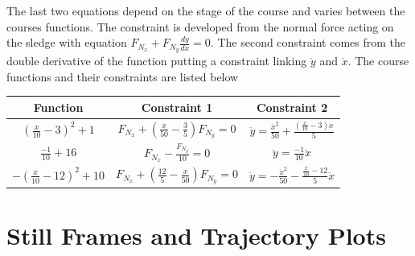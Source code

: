 \documentclass{article}
\begin{document}
The last two equations depend on the stage of the course and varies between the courses functions. The constraint is developed from the normal force acting on the sledge with equation $F_{N_x} + F_{N_y}\frac{dy}{dx}=0$. The second constraint comes from the double derivative of the function putting a constraint linking $\ddot{y}$ and $\ddot{x}$. The course functions and their constraints are listed below
\begin{center}
	\begin{tabular}{c|c|c}
		Function&Constraint 1&Constraint 2\\
		\hline
		$(\frac{x}{10}-3)^2+1$&$F_{N_x}+(\frac{x}{50}-\frac{3}{5})F_{N_y}=0$&$\ddot{y}=\frac{\dot{x}^2}{50} + \frac{\left(\frac{x}{10} - 3\right) \ddot{x}}{5}$\\
		$\frac{-1}{10}+16$&$F_{N_x}-\frac{F_{N_y}}{10}=0$&$\ddot{y}=\frac{-1}{10}\ddot{x}$\\
		$-(\frac{x}{10}-12)^2+10$&$F_{N_x}+(\frac{12}{5}-\frac{x}{50})F_{N_y}=0$&$\ddot{y}=-\frac{\dot{x}^2}{50}-\frac{\frac{x}{10}-12}{5}\ddot{x}$\\
	\end{tabular}
\end{center}

\section{Still Frames and Trajectory Plots}
\end{document}
